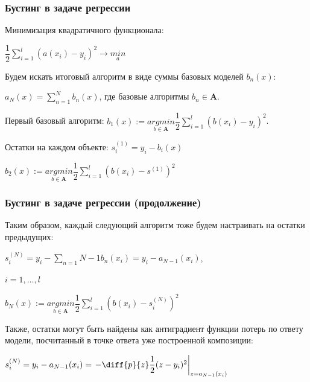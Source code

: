 \documentclass[fleqn,pdf, 9pt, usenames, dvipsnames, unicode, hyperref={bookmarks=true,bookmarksopen=false, bookmarksnumbered}]{beamer}
\begin{document}

\begin{frame}\frametitle{Бустинг в задаче регрессии}

Минимизация квадратичного функционала:

$\dfrac{1}{2}\sum_{i=1}^{l}(a(x_i)-y_i)^2 \rightarrow \underset{a}{min}$

Будем искать итоговый алгоритм в виде суммы базовых моделей $b_n(x)$:

$a_N(x) = \sum_{n=1}^{N}b_n(x)$, где базовые алгоритмы $b_n \in \mathbf{A}$.

Первый базовый алгоритм: $b_1(x):= \underset{b\in\mathbf{A}}{argmin} \dfrac{1}{2}\sum_{i=1}^{l}(b(x_i)-y_i)^2$.

Остатки на каждом объекте:  $s^{(1)}_i = y_i - b_i(x)$

$b_2(x) := \underset{b\in\mathbf{A}}{argmin} \dfrac{1}{2}\sum_{i=1}^{l}(b(x_i)-s^{(1)})^2$



\end{frame}


\begin{frame}\frametitle{Бустинг в задаче регрессии (продолжение)}

Таким образом, каждый следующий алгоритм тоже будем настраивать на остатки предыдущих:

$s^{(N)}_i = y_i - \sum_{n=1}{N-1}b_n(x_i) = y_i - a_{N-1}(x_i)$,

$i=1,\ldots,l$

$b_N(x):= \underset{b\in\mathbf{A}}{argmin} \dfrac{1}{2}\sum_{i=1}^{l}(b(x_i)-s_i^{(N)})^2$

Также, остатки могут быть найдены как антиградиент функции потерь по ответу модели, посчитанный в точке ответа уже построенной композиции:

$s_i^{(N)} = y_i - a_{N-1}(x_i)= \left.- \diff{p}{z}\dfrac{1}{2}(z-y_i)^2\right|_{z=a_{N-1}(x_i)}$

\end{frame}

\end{document}
